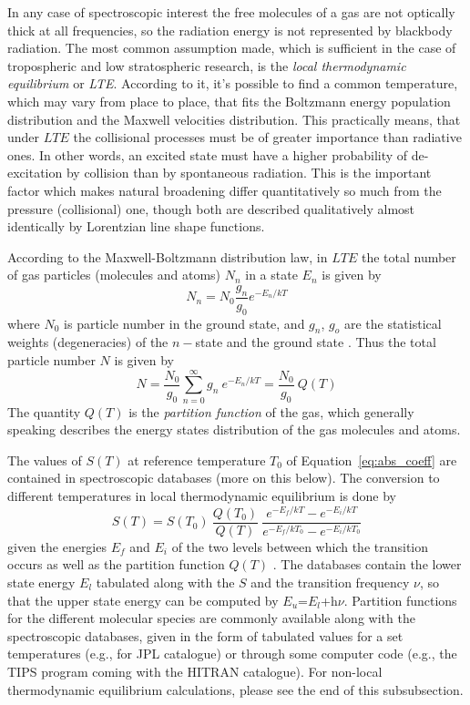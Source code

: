 In any case of spectroscopic interest the free molecules of a gas are
not optically thick at all frequencies, so the radiation energy is not
represented by blackbody radiation. The most common assumption made,
which is sufficient in the case of tropospheric and low stratospheric
research, is the {\textit{local thermodynamic equilibrium}\nocorr} or
{\textit{LTE}\nocorr}. According to it, it's possible to find a common temperature,
which may vary from place to place, that fits the Boltzmann energy
population distribution and the Maxwell velocities distribution.
This practically means, that under $LTE$ the collisional processes
must be of greater importance than radiative ones. In other words,
an excited state must have a higher probability of de-excitation by
collision than by spontaneous radiation. This is the important
factor which makes natural broadening differ quantitatively so much
from the pressure (collisional) one, though both are described
qualitatively almost identically by Lorentzian line shape
functions.

According to the Maxwell-Boltzmann distribution law, in $LTE$ the total number
of gas particles (molecules and atoms) $N_n$  in a state $E_n$ is given by 
\begin{equation}\label{eq:abs_theory:maxwell_distribution2}
 N_n=N_0\frac{g_n}{g_0}e^{-E_n/kT}
\end{equation}
where $N_0$ is particle number in the ground state, and $g_n$, $g_o$
are the statistical weights (degeneracies) of the $n-$state and the
ground state \citep{gordyandcook:70}. Thus the total particle number $N$ is given by
\begin{equation}\label{eq:abs_theory:total_part_number}
 N=\frac{N_0}{g_0}\sum_{n=0}^\infty g_n~e^{-E_n/kT}=\frac{N_0}{g_0}~Q(T)
\end{equation}
The quantity $Q(T)$ is the {\it{partition function}\nocorr} of the
gas, which generally speaking describes the energy states distribution
of the gas molecules and atoms. 

The values of $S(T)$ at reference temperature $T_0$ of
Equation~\ref{eq:abs_coeff} are contained in
spectroscopic databases (more on this below). The conversion to
different temperatures in local thermodynamic equilibrium is done by
\begin{equation}\label{eq:abs_theory:line_intensity}
  S(T)=S(T_0)~\frac{Q(T_0)}{Q(T)}~\frac{e^{-E_f/kT}
    - e^{-E_i/kT}}{e^{-E_f/kT_0} - e^{-E_i/kT_0}}
\end{equation}
given the energies $E_f$ and $E_i$ of the two levels between which the
transition occurs as well as the partition function  $Q(T)$ \citep{rothman:98}.
The databases contain the lower state energy $E_l$ tabulated along with
the $S$ and the transition frequency $\nu$, so that the upper state
energy can be computed by $E_u$=$E_l$+h$\nu$. Partition functions for
the different molecular species are commonly available along with the
spectroscopic databases, given in the form of tabulated values for a set
temperatures (e.g., for JPL catalogue) or through some computer code (e.g.,
the TIPS program coming with the HITRAN catalogue).  For non-local
thermodynamic equilibrium calculations, please see the end of this subsubsection.

